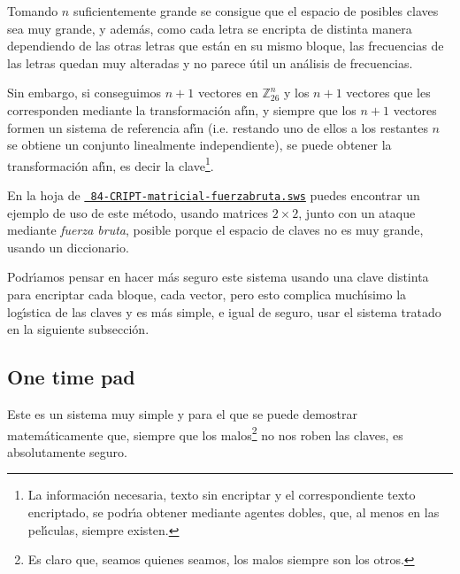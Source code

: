  Tomando $n$ suficientemente grande se consigue que el espacio de posibles
claves sea muy grande, y adem\'as,  como cada letra se encripta de distinta
manera dependiendo de las otras letras que est\'an en su mismo bloque,   las
frecuencias de las letras quedan muy alteradas y no parece \'util un an\'alisis
de frecuencias. 

Sin embargo, si conseguimos $n+1$ vectores  en $\mathbb{Z}_{26}^n$ y los  $n+1$
vectores que les corresponden mediante la transformaci\'on af\'{\i}n, y siempre
que los $n+1$ vectores formen un sistema de referencia af\'{\i}n (i.e. restando
uno de ellos a los restantes $n$ se obtiene un conjunto linealmente
independiente),  se puede obtener la transformaci\'on af\'{\i}n, es decir la
clave\footnote{La informaci\'on necesaria, texto sin encriptar y el
correspondiente texto encriptado,  se podr\'{\i}a obtener mediante agentes
dobles, que,  al menos en las pel\'{\i}culas, siempre existen.}. 


En la hoja de {\sage} 
\href{http://sage.mat.uam.es:8888/home/pub/??/}{\tt 
84-CRIPT-matricial-fuerzabruta.sws}
puedes encontrar un ejemplo de uso de este m\'etodo, usando matrices $2\times 
2$, junto con un ataque mediante {\itshape fuerza bruta}, posible porque el 
espacio de claves no es muy grande,  usando un diccionario. 



Podr\'{\i}amos pensar en hacer m\'as seguro este sistema usando una clave
distinta para encriptar cada bloque, cada vector, pero esto complica
much\'{\i}simo la log\'{\i}stica de las claves y es m\'as simple, e igual de
seguro,  usar el sistema tratado en la siguiente subsecci\'on.











\subsection{One time pad}

Este es un sistema muy simple y para el que se puede demostrar matem\'aticamente
que, siempre que los malos\footnote{Es claro que, seamos quienes seamos, los
malos siempre son los otros.} no nos roben las claves,  es absolutamente seguro.

